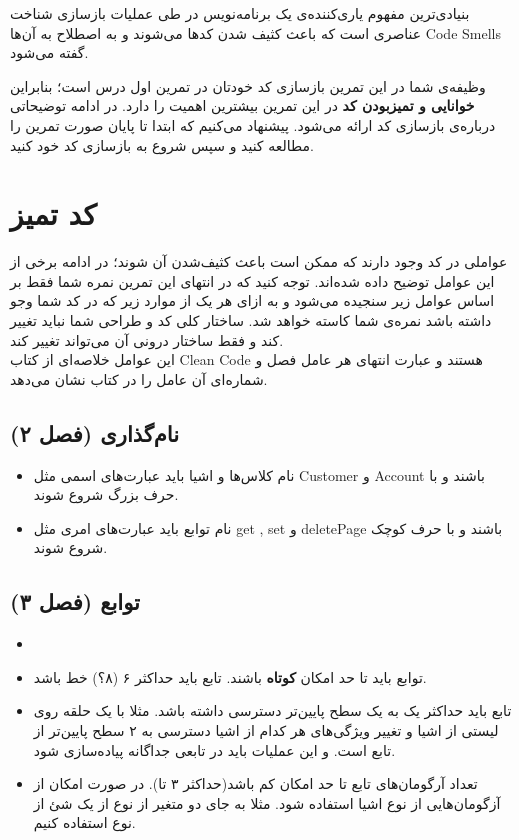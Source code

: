 \documentclass{utap}
\begin{document}
بنیادی‌ترین مفهوم یاری‌کننده‌ی یک برنامه‌نویس در طی عملیات بازسازی شناخت عناصری است که باعث کثیف شدن کدها می‌شوند و به اصطلاح به آن‌ها Code Smells گفته می‌شود.

وظیفه‌ی شما در این تمرین بازسازی کد خودتان در تمرین اول درس است؛ بنابراین \textbf{خوانایی و تمیزبودن کد} در این تمرین بیشترین اهمیت را دارد. در ادامه توضیحاتی درباره‌ی بازسازی کد اراﺋﻪ می‌شود. پیشنهاد می‌کنیم که ابتدا تا پایان صورت تمرین را مطالعه کنید و سپس شروع به بازسازی کد خود کنید.
\newpage
\section{کد تمیز}
عواملی در کد وجود دارند که ممکن است باعث کثیف‌شدن آن شوند؛ در ادامه برخی از این عوامل توضیح داده شده‌اند. توجه کنید که در انتهای این تمرین نمره شما فقط بر اساس عوامل زیر سنجیده می‌شود و به ازای هر یک از موارد زیر که در کد شما وجو داشته باشد نمره‌ی شما کاسته خواهد شد. ساختار کلی کد و طراحی شما نباید تغییر کند و فقط ساختار درونی آن می‌تواند تغییر کند.\\
این عوامل خلاصه‌ای از کتاب Clean Code هستند و عبارت انتهای هر عامل فصل و شماره‌ای آن عامل را در کتاب نشان می‌دهد.

\subsection{نام‌گذاری (فصل ۲)}
  \begin{itemize}
        \item
نام کلاس‌ها و اشیا باید عبارت‌های اسمی مثل Customer و Account باشند و با حرف بزرگ شروع شوند.
	\item
نام توابع باید عبارت‌های امری مثل get , set و deletePage باشند و با حرف کوچک شروع شوند.
    \end{itemize}

\subsection{توابع (فصل ۳)}
  \begin{itemize}
	\item
        \item
توابع باید تا حد امکان \textbf{کوتاه} باشند.
تابع باید حداکثر ۶ (۸‌؟) خط باشد.
	\item
تابع باید حداکثر یک به یک سطح پایین‌تر دسترسی داشته باشد. مثلا با یک حلقه روی لیستی از اشیا و تغییر ویژگی‌های هر کدام از اشیا دسترسی به ۲ سطح پایین‌تر از تابع است. و این عملیات باید در تابعی جداگانه پیاده‌سازی شود.
	\item
تعداد آرگومان‌های تابع تا حد امکان کم باشد(حداکثر ۳ تا). در صورت امکان از آزگومان‌هایی از نوع اشیا استفاده شود. مثلا به جای دو متغیر از نوع  از یک شئ از نوع   استفاده کنیم.
    \end{itemize}
\end{document}
